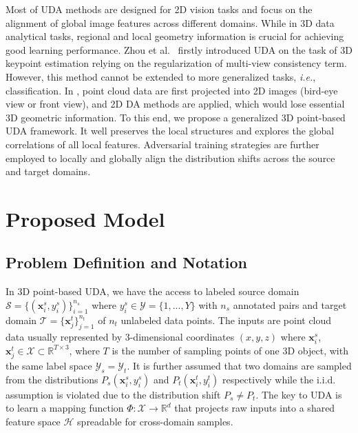 \documentclass{article}
\newcommand*\ie{\textit{i.e.}}
\begin{document}
Most of UDA methods are designed for 2D vision tasks and focus on the alignment of global image features across different domains. While in 3D data analytical tasks, regional and local geometry information is crucial for achieving good learning performance. Zhou et al.~\cite{zhou2018unsupervised} firstly introduced UDA on the task of 3D keypoint estimation relying on the regularization of multi-view consistency term. However, this method cannot be extended to more generalized tasks, \ie, classification. In \cite{saleh2019domain, wu2019squeezesegv2}, point cloud data are first projected into 2D images (bird-eye view or front view), and 2D DA methods are applied, which would lose essential 3D geometric information.  To this end, we propose a generalized 3D point-based UDA framework. It well preserves the local structures and explores the global correlations of all local features. Adversarial training strategies are further employed to locally and globally align the distribution shifts across the source and target domains.


\section{Proposed Model}

\subsection{Problem Definition and Notation}

In 3D point-based UDA, we have the access to labeled source domain $\mathcal{S} = {\{(\textbf{x}_i^s, y_i^s)\}_{i=1}^{n_s}}$ where $y_i^s \in \mathcal{Y} = \{1,...,Y\}$ with $n_s$ annotated pairs and target domain $\mathcal{T} = \{\textbf{x}_j^t\}_{j=1}^{n_t}$ of $n_t$ unlabeled data points. The inputs are point cloud data usually represented by 3-dimensional coordinates $(x, y, z)$ where $\textbf{x}_i^s$, $\textbf{x}_j^t \in \mathcal{X} \subset \mathbb{R}^{T \times 3}$, where $T$ is the number of sampling points of one 3D object, with the same label space $\mathcal{Y}_s = \mathcal{Y}_t$. It is further assumed that two domains are sampled from the distributions $P_s(\textbf{x}_i^s, y_i^s)$ and $P_t(\textbf{x}_i^t, y_i^t)$ respectively while the i.i.d. assumption is violated due to the distribution shift $P_s \neq P_t$. The key to UDA is to learn a mapping function $\Phi: \mathcal{X} \rightarrow \mathbb{R}^{d}$ that projects raw inputs into a shared feature space $\mathcal{H}$ spreadable for cross-domain samples.
\end{document}
